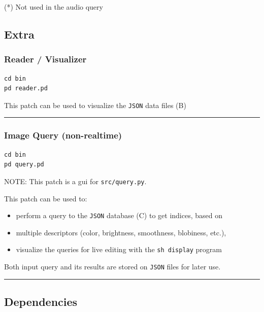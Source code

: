 (*) Not used in the audio query

\hypertarget{extra}{%
\subsection{Extra}\label{extra}}

\hypertarget{reader-visualizer}{%
\subsubsection{Reader / Visualizer}\label{reader-visualizer}}

\begin{verbatim}
cd bin
pd reader.pd
\end{verbatim}

This patch can be used to visualize the \texttt{JSON} data files (B)

\begin{center}\rule{0.5\linewidth}{\linethickness}\end{center}

\hypertarget{image-query-non-realtime}{%
\subsubsection{Image Query (non-realtime)}\label{image-query-non-realtime}}

\begin{verbatim}
cd bin
pd query.pd
\end{verbatim}

NOTE: This patch is a gui for \texttt{src/query.py}.

This patch can be used to:

\begin{itemize}
\tightlist
\item
  perform a query to the \texttt{JSON} database (C) to get indices, based on
\item
  multiple descriptors (color, brightness, smoothness, blobiness, etc.),
\item
  visualize the queries for live editing with the \texttt{sh\ display} program
\end{itemize}

Both input query and its results are stored on \texttt{JSON} files for later use.

\begin{center}\rule{0.5\linewidth}{\linethickness}\end{center}

\hypertarget{dependencies}{%
\subsection{Dependencies}\label{dependencies}}


